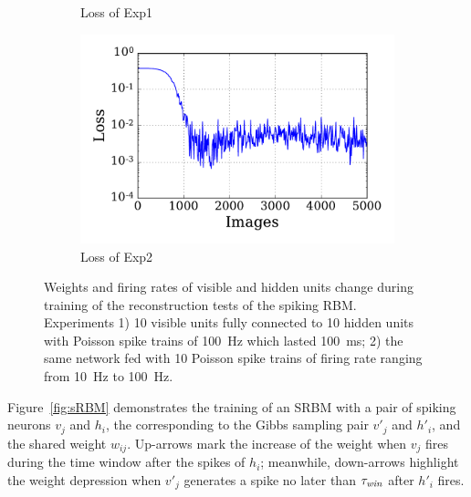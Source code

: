\begin{figure}
\begin{subfigure}[t]{0.48\textwidth}
		\caption{Loss of Exp1}
	\end{subfigure}
	\begin{subfigure}[t]{0.48\textwidth}
		\includegraphics[width=\textwidth]{pics_sdlm/10_exp_SRBM_Orig/exp2_mse_nons.pdf}
		\caption{Loss of Exp2}
	\end{subfigure}
	\caption[SRBM training of the reconstruction tests.]{Weights and firing rates of visible and hidden units change during training of the reconstruction tests of the spiking RBM. 
		Experiments 1) 10 visible units fully connected to 10 hidden units with Poisson spike trains of 100~Hz which lasted 100~ms; 2) the same network fed with 10 Poisson spike trains of firing rate ranging from 10~Hz to 100~Hz.}
	\label{fig:srbm_orig}
\end{figure}

Figure~\ref{fig:sRBM} demonstrates the training of an SRBM with a pair of spiking neurons $v_j$ and $h_i$, the corresponding to the Gibbs sampling pair $v'_j$ and $h'_i$, and the shared weight $w_{ij}$.
Up-arrows mark the increase of the weight when $v_j$ fires during the time window after the spikes of $h_i$;
meanwhile, down-arrows highlight	 the weight depression when $v'_j$ generates a spike no later than $\tau_{\textit{\textrm{win}}}$ after $h'_i$ fires.







